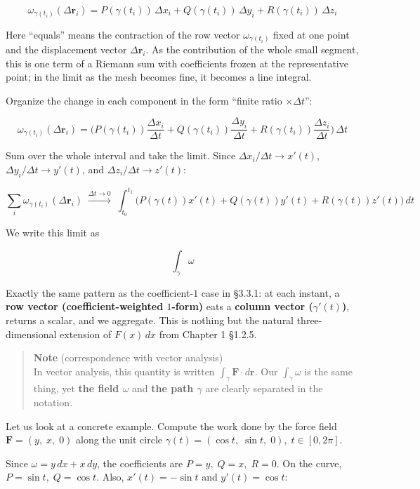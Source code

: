 \documentclass[a4paper,12pt,openany]{book}
\begin{document}
\[\omega_{\gamma(t_i)}(\Delta\mathbf{r}_i) = P(\gamma(t_i))\,\Delta x_i + Q(\gamma(t_i))\,\Delta y_i + R(\gamma(t_i))\,\Delta z_i\]

Here ``equals'' means the contraction of the row vector
\(\omega_{\gamma(t_i)}\) fixed at one point and the displacement vector
\(\Delta\mathbf{r}_i\). As the contribution of the whole small segment,
this is one term of a Riemann sum with coefficients frozen at the
representative point; in the limit as the mesh becomes fine, it becomes
a line integral.

Organize the change in each component in the form ``finite ratio
\(\times \Delta t\)'':

\[\omega_{\gamma(t_i)}(\Delta\mathbf{r}_i) = \bigl(P(\gamma(t_i))\frac{\Delta x_i}{\Delta t} + Q(\gamma(t_i))\frac{\Delta y_i}{\Delta t} + R(\gamma(t_i))\frac{\Delta z_i}{\Delta t}\bigr)\,\Delta t\]

Sum over the whole interval and take the limit. Since
\(\Delta x_i/\Delta t \to x'(t)\), \(\Delta y_i/\Delta t \to y'(t)\),
and \(\Delta z_i/\Delta t \to z'(t)\):

\[
\sum_i \omega_{\gamma(t_i)}(\Delta\mathbf{r}_i)
\;\xrightarrow{\Delta t \to 0}\;
\int_{t_0}^{t_1}
\bigl(P(\gamma(t))x'(t)+Q(\gamma(t))y'(t)+R(\gamma(t))z'(t)\bigr)\,dt
\]

We write this limit as

\[\int_\gamma \omega\]

Exactly the same pattern as the coefficient-\(1\) case in §3.3.1: at
each instant, a \textbf{row vector (coefficient-weighted $1$-form)} eats
a \textbf{column vector ($\gamma'(t)$)}, returns a scalar, and we
aggregate. This is nothing but the natural three-dimensional extension
of \(F(x)\,dx\) from Chapter 1 §1.2.5.

\begin{quote}
\textbf{Note} (correspondence with vector analysis)\\
In vector analysis, this quantity is written
\(\int_\gamma \mathbf{F}\cdot d\mathbf{r}\). Our \(\int_\gamma \omega\)
is the same thing, yet \textbf{the field $\omega$} and
\textbf{the path $\gamma$} are clearly separated in the notation.
\end{quote}

Let us look at a concrete example. Compute the work done by the force
field \(\mathbf{F} = (y,\; x,\; 0)\) along the unit circle
\(\gamma(t) = (\cos t,\; \sin t,\; 0),\; t \in [0, 2\pi]\).

Since \(\omega = y\,dx + x\,dy\), the coefficients are
\(P=y,\;Q=x,\;R=0\). On the curve, \(P=\sin t,\;Q=\cos t\). Also,
\(x'(t)=-\sin t\) and \(y'(t)=\cos t\):
\end{document}
